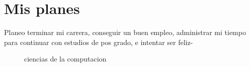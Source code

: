 \newpage


\maketitle
\tableofcontents
\maketitle
{}

\chapter{Mis planes}

Planeo terminar mi carrera, conseguir un buen empleo, administrar mi tiempo para continuar con estudios de pos grado, e intentar ser feliz-

\begin{figure}[h]
  \centerimg
  \caption{ciencias de la computacion}
  \label{fig:computo}
\end{figure}




